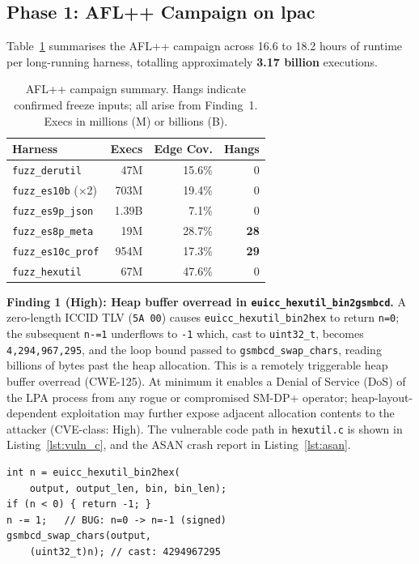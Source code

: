 \documentclass[final,3p,times,twocolumn]{elsarticle}
\begin{document}
\subsection{Phase 1: AFL++ Campaign on lpac}

Table~\ref{tab:afl} summarises the AFL++ campaign across 16.6 to 18.2 hours of
runtime per long-running harness, totalling approximately \textbf{3.17 billion}
executions.

\begin{table}[h]
\centering
\caption{AFL++ campaign summary. Hangs indicate confirmed freeze inputs; all
arise from Finding~1. Execs in millions (M) or billions (B).}
\label{tab:afl}
\begin{tabular}{@{}lrrr@{}}
\toprule
Harness & Execs & Edge Cov. & Hangs \\
\midrule
\texttt{fuzz\_derutil}      & 47M    & 15.6\% & 0  \\
\texttt{fuzz\_es10b} (×2)   & 703M   & 19.4\% & 0  \\
\texttt{fuzz\_es9p\_json}   & 1.39B  & 7.1\%  & 0  \\
\texttt{fuzz\_es8p\_meta}   & 19M    & 28.7\% & \textbf{28} \\
\texttt{fuzz\_es10c\_prof}  & 954M   & 17.3\% & \textbf{29} \\
\texttt{fuzz\_hexutil}      & 67M    & 47.6\% & 0  \\
\bottomrule
\end{tabular}
\end{table}

\textbf{Finding 1 (High): Heap buffer overread in \texttt{euicc\_hexutil\_bin2gsmbcd}.}
A zero-length ICCID TLV (\texttt{5A 00}) causes \texttt{euicc\_hexutil\_bin2hex}
to return \texttt{n=0}; the subsequent \texttt{n-=1} underflows to \texttt{-1}
which, cast to \texttt{uint32\_t}, becomes \texttt{4,294,967,295}, and the loop
bound passed to \texttt{gsmbcd\_swap\_chars}, reading billions of bytes past
the heap allocation.
This is a remotely triggerable heap buffer overread (CWE-125).
At minimum it enables a Denial of Service (DoS) of the LPA process from any
rogue or compromised SM-DP+ operator; heap-layout-dependent exploitation may
further expose adjacent allocation contents to the attacker (CVE-class: High).
The vulnerable code path in \texttt{hexutil.c} is shown in
Listing~\ref{lst:vuln_c}, and the ASAN crash report in
Listing~\ref{lst:asan}.

\begin{lstlisting}[style=codestyle,caption={Vulnerable code in \texttt{euicc\_hexutil\_bin2gsmbcd} (hexutil.c lines 101 to 114). Line 3 underflows when \texttt{bin\_len=0}.},label=lst:vuln_c]
int n = euicc_hexutil_bin2hex(
    output, output_len, bin, bin_len);
if (n < 0) { return -1; }
n -= 1;   // BUG: n=0 -> n=-1 (signed)
gsmbcd_swap_chars(output,
    (uint32_t)n); // cast: 4294967295
\end{lstlisting}
\end{document}
